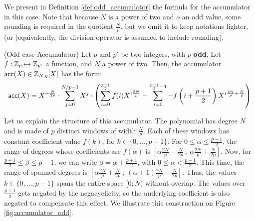 We present in Definition \ref{def:odd_accumulator} the formula for the accumulator in this case. Note that because $N$ is a power of two and $o$ an odd value, some rounding is required in the quotient $\frac N p$, but we omit it to keep notations lighter, (or )equivalently, the division operator is assumed to include rounding).

\begin{definition}(Odd-case Accumulator)
	Let $p$ and $p'$ be two integers, with $p$ \textbf{odd}. Let $f: \mathbb{Z}_p \mapsto \mathbb{Z}_{p'}$ a function, and $N$ a power of two. Then, the accumulator $\textsf{acc}(X) \in \mathbb{Z}_{N,q}[X]$ has the form:
	\[
		\textsf{acc}(X) = X^{- \frac {N} {2p}} \cdot \sum_{j=0}^{N/p - 1} X^j  \cdot \left ( \sum_{i=0}^{\frac{p-1}{2}} f(i) X^{i \frac{2N}{p}} + \sum_{i=0}^{\frac{p-1}{2} - 1} -f \left (i + \frac{p+1}{2} \right ) X^{i \frac{2N}{p} + \frac N p} \right )
	\]
\end{definition}



Let us explain the structure of this accumulator. The polynomial has degree $N$ and is made of $p$ distinct windows of width $\frac{N}{p}$. Each of these windows has constant coefficient value $f(k)$, for $k \in \{0, \dots, p-1\}$.
For $0 \le \alpha \le \frac{p-1}{2}$, the range of degrees whose coefficients are $f(\alpha)$ is $\left [ \alpha \frac{2N}{p} - \frac{N}{2p}~;~ \alpha \frac{2N}{p} + \frac{N}{2p} \right ]$. Now, for $\frac{p+1}{2} \le \beta \le p-1$, we can write $\beta = \alpha + \frac{p+1}{2}$, with $0 \le \alpha < \frac{p-1}{2}$. This time, the range of spanned degrees is $\left [ \alpha \frac{2N}{p} + \frac{N}{2p} ~;~ (\alpha + 1) \frac{2N}{p} - \frac{N}{2p} \right ]$. Thus, the values $k \in \{0, \dots, p-1\}$ spans the entire space $[0; N)$ without overlap. The values over $\frac{p+1}{2}$ gets negated by the negacyclicity, so the underlying coefficient is also negated to compensate this effect. We illustrate this construction on Figure \ref{fig:accumulator_odd}.



